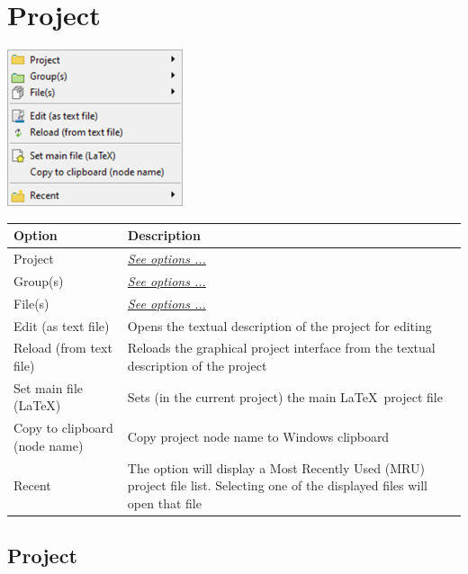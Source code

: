 
\hypertarget{menu_project}{}
\section{Project}

\includegraphics[scale=0.50]{./res/menu_project.png}\\

\begin{scriptsize}\begin{tabularx}{\textwidth}{>{\hsize=0.3\hsize}X>{\hsize=0.8\hsize}X}\\
    \hline
    \textbf{Option} & \textbf{Description} \\
    \hline
    Project & \textit{\href{\#menu\_project\_project}{See options ...}} \\
    Group(s) & \textit{\href{\#menu\_project\_group}{See options ...}} \\
    File(s) & \textit{\href{\#menu\_project\_file}{See options ...}} \\
    \hdashline[1pt/1pt]
    Edit (as text file) & Opens the textual description of the project for editing \\
    Reload (from text file) & Reloads the graphical project interface from the
     textual description of the project \\
    \hdashline[1pt/1pt]
    Set main file (\LaTeX) & Sets (in the current project) the main \LaTeX ~project file \\
    Copy to clipboard (node name) & Copy project node name to Windows clipboard \\
    \hdashline[1pt/1pt]
    Recent & The option will display a Most Recently Used (MRU) project file list.
     Selecting one of the displayed files will open that file \\
    \hline
  \end{tabularx}\end{scriptsize}


\hypertarget{menu_project_project}{}
\subsection{Project}

